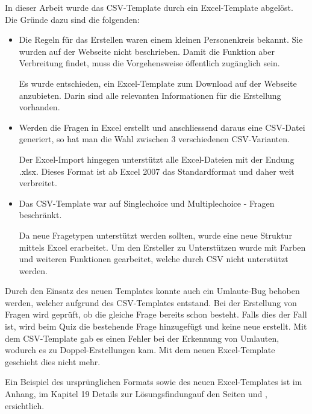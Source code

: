 In dieser Arbeit wurde das CSV-Template durch ein Excel-Template abgelöst. Die Gründe dazu sind die folgenden:
\begin{itemize}
	\item Die Regeln für das Erstellen waren einem kleinen Personenkreis bekannt. Sie wurden auf der Webseite nicht beschrieben. Damit die Funktion aber Verbreitung findet, muss die Vorgehensweise öffentlich zugänglich sein.
	
	Es wurde entschieden, ein Excel-Template zum Download auf der Webseite anzubieten. Darin sind alle relevanten Informationen für die Erstellung vorhanden.
	
	\item Werden die Fragen in Excel erstellt und anschliessend daraus eine CSV-Datei generiert, so hat man die Wahl zwischen 3 verschiedenen CSV-Varianten.
	
	Der Excel-Import hingegen unterstützt alle Excel-Dateien mit der Endung .xlsx. Dieses Format ist ab Excel 2007 das Standardformat und daher weit verbreitet.
	\cite{microsoft2016}
	
	\item Das CSV-Template war auf Singlechoice und Multiplechoice - Fragen beschränkt.
	
	Da neue Fragetypen unterstützt werden sollten, wurde eine neue Struktur mittels Excel erarbeitet. Um den Ersteller zu Unterstützen wurde mit Farben und weiteren Funktionen gearbeitet, welche durch CSV nicht unterstützt werden.

\end{itemize}

Durch den Einsatz des neuen Templates konnte auch ein Umlaute-Bug behoben werden, welcher aufgrund des CSV-Templates entstand. Bei der Erstellung von Fragen wird geprüft, ob die gleiche Frage bereits schon besteht. Falls dies der Fall ist, wird beim Quiz die bestehende Frage hinzugefügt und keine neue erstellt. Mit dem CSV-Template gab es einen Fehler bei der Erkennung von Umlauten, wodurch es zu Doppel-Erstellungen kam. Mit dem neuen Excel-Template geschieht dies nicht mehr.

\bigskip

Ein Beispiel des ursprünglichen Formats sowie des neuen Excel-Templates ist im Anhang, im Kapitel 19 \glqq Details zur Lösungsfindung\grqq auf den Seiten \hyperlink{page.\getpagerefnumber{pdf:csvTemplate}}{} und \hyperlink{page.\getpagerefnumber{pdf:excelTemplate}}{}, ersichtlich.

